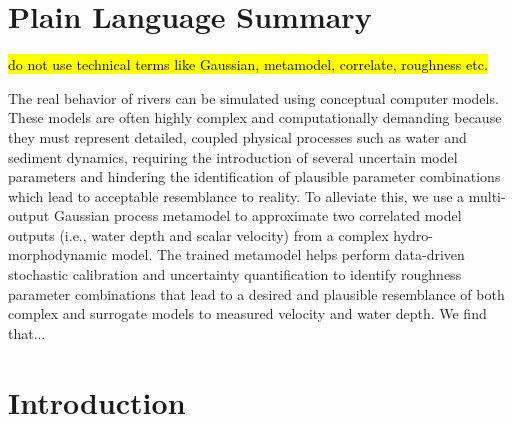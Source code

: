 \documentclass[draft,linenumbers,onecolumn]{agujournal2019} %
\begin{document}
\section*{Plain Language Summary}
\hl{do not use technical terms like Gaussian, metamodel, correlate, roughness etc.}

The real behavior of rivers can be simulated using conceptual computer models. These models are often highly complex and computationally demanding because they must represent detailed, coupled physical processes such as water and sediment dynamics, requiring the introduction of several uncertain model parameters and hindering the identification of plausible parameter combinations which lead to acceptable resemblance to reality. To alleviate this, we use a multi-output Gaussian process metamodel to approximate two correlated model outputs (i.e., water depth and scalar velocity) from a complex  hydro-morphodynamic model. The trained metamodel helps perform data-driven stochastic calibration and uncertainty quantification to identify roughness parameter combinations that lead to a desired and plausible resemblance of both complex and  surrogate models to measured velocity and water depth. We find that...   


\section{Introduction}
\end{document}
